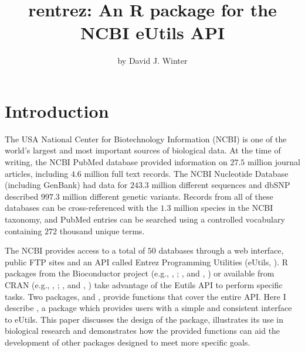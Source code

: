 \title{rentrez: An R package for the NCBI eUtils API}
\author{by David J. Winter}

\maketitle


\section{Introduction}

The USA National Center for Biotechnology Information (NCBI) is one of the world's 
largest and most important sources of biological data. At the time of writing, the NCBI
PubMed database provided information on $27.5$ million journal
articles, including $4.6$ million full text records. The NCBI
Nucleotide Database (including GenBank) had data for $243.3$ million different sequences and dbSNP described $997.3$ 
million different genetic variants. Records from all of these databases can be 
cross-referenced with the $1.3$ million species in the NCBI taxonomy, and PubMed entries can be searched using a 
controlled vocabulary containing $272$ thousand unique terms. 

The NCBI provides access to a total of $50$ databases 
through a web interface, public FTP sites and an API called Entrez Programming
Utilities (eUtils, \citealt{sayers_EUtils}). R packages from the Bioconductor 
project (e.g., , \citealt{genomes}; , 
\citealt{RMassBank} and , \citealt{MeSHSim}) or available from 
CRAN (e.g., , \citealt{APE}; , \citealt{RISmed} and
, \citealt{miner}) take advantage of the Eutils API to 
perform specific tasks. Two packages,  and  
\citep{reutils}, provide functions that cover the entire API.  Here I describe 
, a package which provides users with a simple and consistent 
interface to eUtils. This paper discusses the design of the package, illustrates 
its use in biological research and demonstrates how the provided functions can 
aid the development of other packages designed to meet more specific goals.

